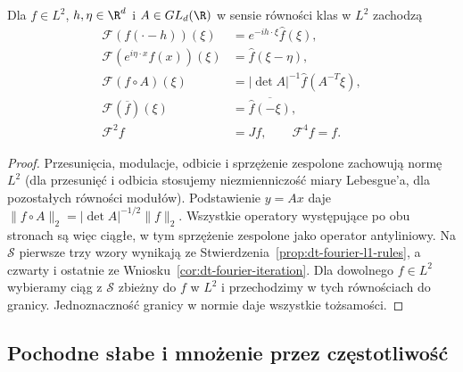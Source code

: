 \begin{stwierdzenie}
\label{prop:dt-fourier-l2-rules}
Dla $f\in L^2$, $h,\eta\in\R^d$ i $A\in GL_d(\R)$
w sensie równości klas w $L^2$ zachodzą
\[
\begin{aligned}
 \mathcal F(f(\cdot-h))(\xi)&=e^{-ih\cdot\xi}\widehat f(\xi),\\
 \mathcal F(e^{i\eta\cdot x}f(x))(\xi)&=\widehat f(\xi-\eta),\\
 \mathcal F(f\circ A)(\xi)&=|\det A|^{-1}
 \widehat f(A^{-T}\xi),\\
 \mathcal F(\overline f)(\xi)&=\overline{\widehat f(-\xi)},\\
 \mathcal F^2f&=Jf,\qquad \mathcal F^4f=f .
\end{aligned}
\]
\end{stwierdzenie}
\begin{proof}
Przesunięcia, modulacje, odbicie i sprzężenie zespolone
zachowują normę $L^2$ (dla przesunięć i odbicia stosujemy
niezmienniczość miary Lebesgue'a, dla pozostałych
równości modułów). Podstawienie $y=Ax$ daje
$\|f\circ A\|_2=|\det A|^{-1/2}\|f\|_2$.
Wszystkie operatory występujące po obu stronach są
więc ciągłe, w tym sprzężenie zespolone jako operator
antyliniowy. Na $\mathcal S$ pierwsze trzy wzory
wynikają ze Stwierdzenia~\ref{prop:dt-fourier-l1-rules},
a czwarty i ostatnie ze Wniosku~\ref{cor:dt-fourier-iteration}.
Dla dowolnego $f\in L^2$ wybieramy ciąg z $\mathcal S$
zbieżny do $f$ w $L^2$ i przechodzimy w tych
równościach do granicy. Jednoznaczność granicy
w normie daje wszystkie tożsamości.
\end{proof}

\subsection{Pochodne słabe i mnożenie przez częstotliwość}

